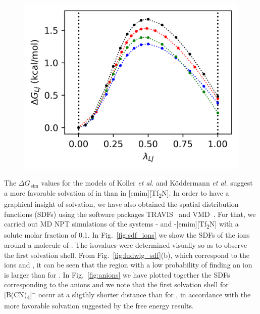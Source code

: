 \documentclass[3p,twocolumn]{elsarticle}
\begin{document}
\begin{figure}[]
\includegraphics[width=\linewidth]{free_energy_paper}
\label{fig:deltag}
\end{figure}

The $\Delta G_{\, \text{sim}}$ values for the models of Koller \textit{et al.} \cite{Koller_2012} and K\"{o}ddermann \textit{et al.} \cite{K_ddermann_2007} suggest a more favorable solvation of  in \ce{[emim][B(CN)_4]} than in [emim][Tf\textsubscript{2}N]. In order to have a graphical insight of solvation, we have also obtained the spatial distribution functions (SDFs) \cite{Svishchev_1993} using the software packages TRAVIS~\cite{Brehm_2011} and VMD~\cite{HUMP96}. For that, we carried out MD NPT simulations of the systems -\ce{[emim][B(CN)_4]} and -[emim][Tf\textsubscript{2}N] with a solute molar fraction of 0.1. In Fig.~\ref{fig:sdf_ions} we show the SDFs of the ions around a molecule of . The isovalues were determined visually so as to observe the first solvation shell. From Fig.~\ref{fig:ludwig_sdf}(b), which correspond to the ions \ce{[emim]^+} and \ce{[NTf_2]^-}, it can be seen that the region with a low probability of finding an ion is larger than for \ce{[emim][B(CN)_4]}. In Fig.~\ref{fig:anions} we have plotted together the SDFs corresponding to the anions and we note that the first solvation shell for [B(CN)\textsubscript{4}]$^{-}$ occur at a sligthly shorter distance than for \ce{[NTf_2]^-}, in accordance with the more favorable solvation suggested by the free energy results.
\end{document}
